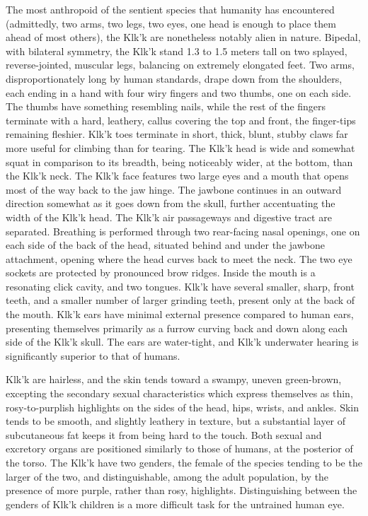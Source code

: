The most anthropoid of the sentient species that humanity has
encountered (admittedly, two arms, two legs, two eyes, one head is
enough to place them ahead of most others), the Klk'k are nonetheless
notably alien in nature. Bipedal, with bilateral symmetry, the Klk'k
stand 1.3 to 1.5 meters tall on two splayed, reverse-jointed, muscular
legs, balancing on extremely elongated feet. Two arms,
disproportionately long by human standards, drape down from the
shoulders, each ending in a hand with four wiry fingers and two
thumbs, one on each side. The thumbs have something resembling nails,
while the rest of the fingers terminate with a hard, leathery, callus
covering the top and front, the finger-tips remaining fleshier. Klk'k
toes terminate in short, thick, blunt, stubby claws far more useful
for climbing than for tearing. The Klk'k head is wide and somewhat
squat in comparison to its breadth, being noticeably wider, at the
bottom, than the Klk'k neck. The Klk'k face features two large eyes
and a mouth that opens most of the way back to the jaw hinge. The
jawbone continues in an outward direction somewhat as it goes down
from the skull, further accentuating the width of the Klk'k head. The
Klk'k air passageways and digestive tract are separated. Breathing is
performed through two rear-facing nasal openings, one on each side of
the back of the head, situated behind and under the jawbone
attachment, opening where the head curves back to meet the neck. The
two eye sockets are protected by pronounced brow ridges. Inside the
mouth is a resonating click cavity, and two tongues. Klk'k have
several smaller, sharp, front teeth, and a smaller number of larger
grinding teeth, present only at the back of the mouth. Klk'k ears have
minimal external presence compared to human ears, presenting
themselves primarily as a furrow curving back and down along each side
of the Klk'k skull. The ears are water-tight, and Klk'k underwater
hearing is significantly superior to that of humans.

Klk'k are hairless, and the skin tends toward a swampy, uneven
green-brown, excepting the secondary sexual characteristics which
express themselves as thin, rosy-to-purplish highlights on the sides
of the head, hips, wrists, and ankles. Skin tends to be smooth, and
slightly leathery in texture, but a substantial layer of subcutaneous
fat keeps it from being hard to the touch. Both sexual and excretory
organs are positioned similarly to those of humans, at the posterior
of the torso. The Klk'k have two genders, the female of the species
tending to be the larger of the two, and distinguishable, among the
adult population, by the presence of more purple, rather than rosy,
highlights. Distinguishing between the genders of Klk'k children is a
more difficult task for the untrained human eye.

